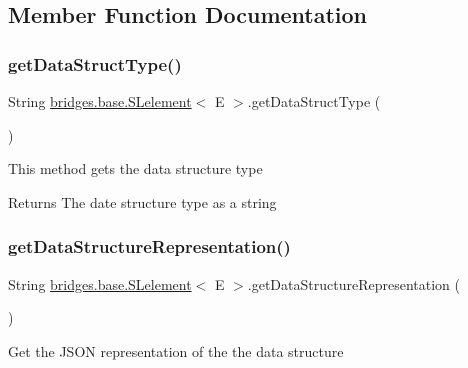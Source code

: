 \subsection{Member Function Documentation}
\mbox{\label{classbridges_1_1base_1_1_s_lelement_a8c48a2d34b238fa0ae7bf2d1ee58ea88}} 
\subsubsection{\texorpdfstring{get\+Data\+Struct\+Type()}{getDataStructType()}}
{\footnotesize\ttfamily String \mbox{\hyperlink{classbridges_1_1base_1_1_s_lelement}{bridges.\+base.\+S\+Lelement}}$<$ E $>$.get\+Data\+Struct\+Type (\begin{DoxyParamCaption}{ }\end{DoxyParamCaption})}

This method gets the data structure type

\begin{DoxyReturn}{Returns}
The date structure type as a string 
\end{DoxyReturn}
\mbox{\label{classbridges_1_1base_1_1_s_lelement_a2928f5e8640deaceeecf01adcd75669b}} 
\subsubsection{\texorpdfstring{get\+Data\+Structure\+Representation()}{getDataStructureRepresentation()}}
{\footnotesize\ttfamily String \mbox{\hyperlink{classbridges_1_1base_1_1_s_lelement}{bridges.\+base.\+S\+Lelement}}$<$ E $>$.get\+Data\+Structure\+Representation (\begin{DoxyParamCaption}{ }\end{DoxyParamCaption})}

Get the J\+S\+ON representation of the the data structure

